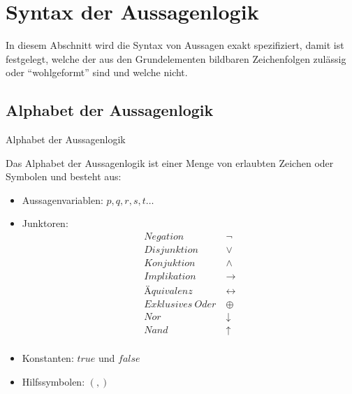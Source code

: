 \section{Syntax der Aussagenlogik}
In diesem Abschnitt wird die Syntax von Aussagen exakt spezifiziert, damit ist festgelegt,
welche der aus den Grundelementen bildbaren Zeichenfolgen zulässig oder ``wohlgeformt'' sind und welche nicht.


\subsection{Alphabet der Aussagenlogik}
\begin{defi}Alphabet der Aussagenlogik\label{Definition 2.1}\end{defi}Das Alphabet der Aussagenlogik ist einer Menge von erlaubten Zeichen oder Symbolen und besteht aus:
\begin{itemize}
\item Aussagenvariablen: $p, q, r, s, t \ldots$
\item Junktoren: 
\begin{align*}
Negation  &\ \neg\\
Disjunktion &\ \vee\\  
Konjuktion &\ \wedge \\  
Implikation &\ \rightarrow\\      
Äquivalenz &\ \leftrightarrow\\ 
Exklusives \ Oder &\ \oplus\\  
Nor &\ \downarrow\\   
Nand &\ \uparrow\\
\end{align*}
\item Konstanten: $true$ und $false$\cite{Schenke}
\item Hilfssymbolen: $(,)$ 
\end{itemize}

